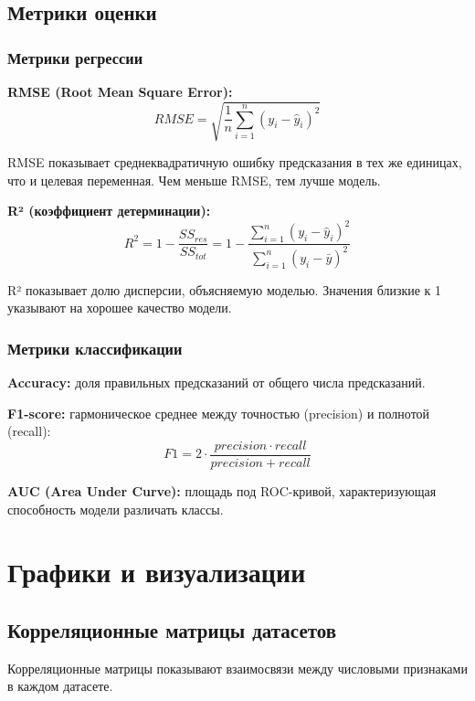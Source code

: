\documentclass[a4paper]{article}
\begin{document}
\subsection{Метрики оценки}

\subsubsection{Метрики регрессии}
\textbf{RMSE (Root Mean Square Error):}
$$RMSE = \sqrt{\frac{1}{n}\sum_{i=1}^{n}(y_i - \hat{y}_i)^2}$$

RMSE показывает среднеквадратичную ошибку предсказания в тех же единицах, что и целевая переменная. Чем меньше RMSE, тем лучше модель.

\textbf{R² (коэффициент детерминации):}
$$R^2 = 1 - \frac{SS_{res}}{SS_{tot}} = 1 - \frac{\sum_{i=1}^{n}(y_i - \hat{y}_i)^2}{\sum_{i=1}^{n}(y_i - \bar{y})^2}$$

R² показывает долю дисперсии, объясняемую моделью. Значения близкие к 1 указывают на хорошее качество модели.

\subsubsection{Метрики классификации}
\textbf{Accuracy:} доля правильных предсказаний от общего числа предсказаний.

\textbf{F1-score:} гармоническое среднее между точностью (precision) и полнотой (recall):
$$F1 = 2 \cdot \frac{precision \cdot recall}{precision + recall}$$

\textbf{AUC (Area Under Curve):} площадь под ROC-кривой, характеризующая способность модели различать классы.

\section{Графики и визуализации}

\subsection{Корреляционные матрицы датасетов}

Корреляционные матрицы показывают взаимосвязи между числовыми признаками в каждом датасете.
\end{document}
